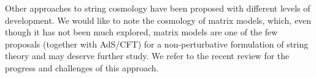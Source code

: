 Other approaches to string cosmology have been proposed with different levels of development. We would like to note the cosmology of matrix models, which, even though it has not been much explored, matrix models \cite{Banks:1996vh,Ishibashi:1996xs} are one of the few proposals (together with AdS/CFT)  for a non-perturbative formulation of string theory and may deserve further study. We refer to the recent review \cite{Brahma:2022ikl} for the progress and challenges of this approach. 

\enddocument

 \newpage



